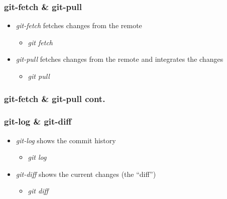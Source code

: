 \documentclass{beamer}
\begin{document}
\begin{frame}
  \frametitle{git-fetch \& git-pull}
  \begin{itemize}
  \item<1-> \textit{git-fetch} fetches changes from the remote
    \begin{itemize}
    \item<2-> \textit{git fetch}
    \end{itemize}
  \item<3-> \textit{git-pull} fetches changes from the remote and integrates the changes
    \begin{itemize}
    \item<4-> \textit{git pull}
    \end{itemize}
  \end{itemize}
\end{frame}

\begin{frame}
  \frametitle{git-fetch \& git-pull cont.}
  {\centering
  }
\end{frame}

\begin{frame}
  \frametitle{git-log \& git-diff}
  \begin{itemize}
  \item<1-> \textit{git-log} shows the commit history
    \begin{itemize}
    \item<1->[] \textit{git log}
    \end{itemize}
  \item<1-> \textit{git-diff} shows the current changes (the ``diff'')
    \begin{itemize}
    \item<1->[] \textit{git diff}
    \end{itemize}
  \end{itemize}
\end{frame}
\end{document}
